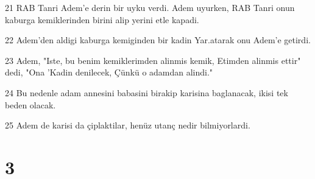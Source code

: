 \par 21 RAB Tanri Adem'e derin bir uyku verdi. Adem uyurken, RAB Tanri onun kaburga kemiklerinden birini alip yerini etle kapadi.
\par 22 Adem'den aldigi kaburga kemiginden bir kadin Yar.atarak onu Adem'e getirdi.
\par 23 Adem, "Iste, bu benim kemiklerimden alinmis kemik, Etimden alinmis ettir" dedi, "Ona 'Kadin denilecek, Çünkü o adamdan alindi."
\par 24 Bu nedenle adam annesini babasini birakip karisina baglanacak, ikisi tek beden olacak.
\par 25 Adem de karisi da çiplaktilar, henüz utanç nedir bilmiyorlardi.

\chapter{3}

